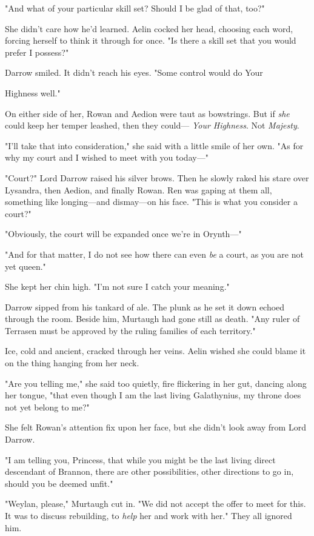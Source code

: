 "And what of your particular skill set? Should I be glad of that, too?"

She didn't care how he'd learned. Aelin cocked her head, choosing each word, forcing herself to think it through for once. "Is there a skill set that you would prefer I possess?"

Darrow smiled. It didn't reach his eyes. "Some control would do Your

Highness well."

On either side of her, Rowan and Aedion were taut as bowstrings. But if
\emph{she} could keep her temper leashed, then they could--- \emph{Your Highness}. Not \emph{Majesty}.

"I'll take that into consideration," she said with a little smile of her own. "As for why my court and I wished to meet with you today---"

"Court?" Lord Darrow raised his silver brows. Then he slowly raked his stare over Lysandra, then Aedion, and finally Rowan. Ren was gaping at them all, something like longing---and dismay---on his face. "This is what you consider a court?"

"Obviously, the court will be expanded once we're in Orynth---"

"And for that matter, I do not see how there can even \emph{be} a court, as you are not yet queen."

She kept her chin high. "I'm not sure I catch your meaning."

Darrow sipped from his tankard of ale. The plunk as he set it down echoed through the room. Beside him, Murtaugh had gone still as death. "Any ruler of Terrasen must be approved by the ruling families of each territory."

Ice, cold and ancient, cracked through her veins. Aelin wished she could blame it on the thing hanging from her neck.

"Are you telling me," she said too quietly, fire flickering in her gut, dancing along her tongue, "that even though I am the last living Galathynius, my throne does not yet belong to me?"

She felt Rowan's attention fix upon her face, but she didn't look away from Lord Darrow.

"I am telling you, Princess, that while you might be the last living direct descendant of Brannon, there are other possibilities, other directions to go in, should you be deemed unfit."

"Weylan, please," Murtaugh cut in. "We did not accept the offer to meet for this. It was to discuss rebuilding, to \emph{help} her and work with her." They all ignored him.

